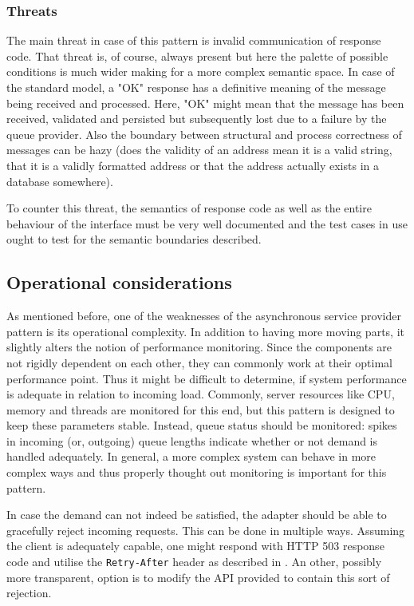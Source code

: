 \documentclass[10pt,a4paper]{article}
\begin{document}
\subsubsection{Threats}
The main threat in case of this pattern is invalid communication of response code. That threat is, of course, always present but here the palette of possible conditions is much wider making for a more complex semantic space. In case of the standard model, a "OK" response has a definitive meaning of the message being received and processed. Here, "OK" might mean that the message has been received, validated and persisted but subsequently lost due to a failure by the queue provider. Also the boundary between structural and process correctness of messages can be hazy (does the validity of an address mean it is a valid string, that it is a validly formatted address or that the address actually exists in a database somewhere). 

To counter this threat, the semantics of response code as well as the entire behaviour of the interface must be very well documented and the test cases in use ought to test for the semantic boundaries described.

\subsection{Operational considerations}
\label{sec:p:6:ops}
As mentioned before, one of the weaknesses of the asynchronous service provider pattern is its operational complexity. In addition to having more moving parts, it slightly alters the notion of performance monitoring. Since the components are not rigidly dependent on each other, they can commonly work at their optimal performance point. Thus it might be difficult to determine, if system performance is adequate in relation to incoming load. Commonly, server resources like CPU, memory and threads are monitored for this end, but this pattern is designed to keep these parameters stable. Instead, queue status should be monitored: spikes in incoming (or, outgoing) queue lengths indicate whether or not demand is handled adequately. In general, a more complex system can behave in more complex ways and thus properly thought out monitoring is important for this pattern.

In case the demand can not indeed be satisfied, the adapter should be able to gracefully reject incoming requests. This can be done in multiple ways. Assuming the client is adequately capable, one might respond with HTTP 503 response code and utilise the \texttt{Retry-After} header as described in \cite{RFC2616}. An other, possibly more transparent, option is to modify the API provided to contain this sort of rejection.
\end{document}
